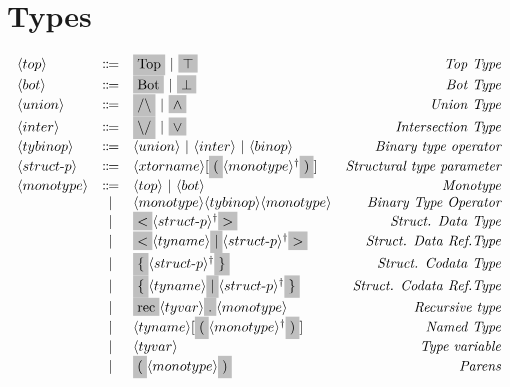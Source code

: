 \section{Types}
\[
  \begin{array}{lclr}
    \nonterminal{top} & \Coloneqq & \terminal{Top}\ |\ \terminal{$\top$} & \emph{Top Type} \\
    \nonterminal{bot} & \Coloneqq & \terminal{Bot}\ |\ \terminal{$\bot$} & \emph{Bot Type} \\
    \nonterminal{union} & \Coloneqq & \terminal{$/\backslash$}\ |\ \terminal{$\wedge$} & \emph{Union Type} \\
    \nonterminal{inter} & \Coloneqq & \terminal{$\backslash /$}\ |\ \terminal{$\vee$} & \emph{Intersection Type} \\
    \nonterminal{tybinop} & \Coloneqq & \nonterminal{union}\ |\ \nonterminal{inter}\ |\ \nonterminal{binop} & \emph{Binary type operator} \\
    \nonterminal{struct$-$p} & \Coloneqq & \nonterminal{xtorname}[\terminal{(}\commalist{\nonterminal{monotype}} \terminal{)}] & \emph{Structural type parameter} \\
    \nonterminal{monotype} & \Coloneqq & \nonterminal{top}\ |\ \nonterminal{bot} & \emph{Monotype} \\
    & | & \nonterminal{monotype} \nonterminal{tybinop} \nonterminal{monotype} & \emph{Binary Type Operator} \\
    & | & \terminal{$<$} \commalist{\nonterminal{struct$-$p}} \terminal{$>$} & \emph{Struct. Data Type} \\
    & | & \terminal{$<$} \nonterminal{tyname} \terminal{$|$} \commalist{\nonterminal{struct$-$p}} \terminal{$>$} & \emph{Struct. Data Ref.Type} \\
    & | & \terminal{$\{$} \commalist{\nonterminal{struct$-$p}} \terminal{$\}$} & \emph{Struct. Codata Type} \\
    & | & \terminal{$\{$} \nonterminal{tyname} \terminal{$|$} \commalist{\nonterminal{struct$-$p}} \terminal{$\}$} & \emph{Struct. Codata Ref.Type} \\
    & | & \terminal{rec} \nonterminal{tyvar} \terminal{.} \nonterminal{monotype} & \emph{Recursive type} \\
    & | & \nonterminal{tyname}[\terminal{(} \commalist{\nonterminal{monotype}}\terminal{)}] & \emph{Named Type} \\
    & | & \nonterminal{tyvar} & \emph{Type variable} \\
    & | & \terminal{(} \nonterminal{monotype} \terminal{)} & \emph{Parens} \\[4mm]

\end{array}\]
